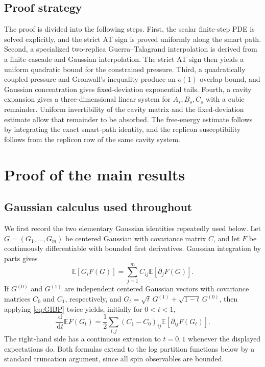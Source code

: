 \documentclass[11pt]{article}
\numberwithin{equation}{section}
\theoremstyle{plain}
\theoremstyle{definition}
\newcommand{\E}{\mathbb E}
\newcommand{\1}{\mathbf 1}
\newcommand{\dd}{\,\mathrm d}
\begin{document}
\subsection{Proof strategy}

The proof is divided into the following steps.  First, the scalar
finite-step PDE is solved explicitly, and the strict AT sign is proved
uniformly along the smart path.  Second, a specialized two-replica
Guerra--Talagrand interpolation is derived from a finite cascade and
Gaussian interpolation.  The strict AT sign then yields a uniform
quadratic bound for the constrained pressure.  Third, a quadratically
coupled pressure and Gronwall's inequality produce an $o(1)$ overlap
bound, and Gaussian concentration gives fixed-deviation exponential
tails.  Fourth, a cavity expansion gives a three-dimensional linear
system for $A_s,B_s,C_s$ with a cubic remainder.  Uniform invertibility
of the cavity matrix and the fixed-deviation estimate allow that
remainder to be absorbed.  The free-energy estimate follows by
integrating the exact smart-path identity, and the replicon
susceptibility follows from the replicon row of the same cavity system.

\section{Proof of the main results}\label{sec:proof}

\subsection{Gaussian calculus used throughout}\label{subsec:gaussian}

We first record the two elementary Gaussian identities repeatedly used
below.  Let $G=(G_1,\ldots,G_m)$ be centered Gaussian with covariance
matrix $C$, and let $F$ be continuously differentiable with bounded
first derivatives.  Gaussian integration by parts gives
\begin{equation}
 \E[G_iF(G)]=\sum_{j=1}^m C_{ij}\E[\partial_jF(G)].
 \label{eq:GIBP}
\end{equation}
If $G^{(0)}$ and $G^{(1)}$ are independent centered Gaussian vectors
with covariance matrices $C_0$ and $C_1$, respectively, and
$G_t=\sqrt t\,G^{(1)}+\sqrt{1-t}\,G^{(0)}$, then applying
\eqref{eq:GIBP} twice yields, initially for $0<t<1$,
\begin{equation}
 \frac{\dd}{\dd t}\E F(G_t)
 =\frac12\sum_{i,j}(C_1-C_0)_{ij}
   \E[\partial_{ij}F(G_t)].
 \label{eq:gaussianinterpolation}
\end{equation}
The right-hand side has a continuous extension to $t=0,1$ whenever
the displayed expectations do.  Both formulas extend to the log
partition functions below by a standard truncation argument, since all
spin observables are bounded.
\end{document}
